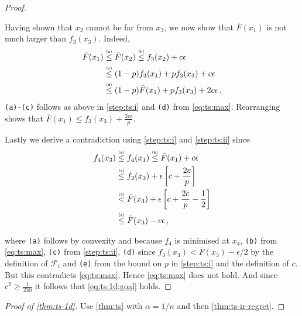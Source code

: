 \documentclass[letter, 12pt]{report}
\newcommand{\explan}[1]{\stackrel{\text{\tiny \texttt{#1}}}}
\newcommand{\sF}{\mathscr F}
\newcommand{\1}{\mathbf{1}}
\theoremstyle{plain}
\theoremstyle{definition}
\theoremstyle{remark}
\begin{document}
\begin{proof}
\begin{enumsteps}
        \item \label{step:ts:ii} Having shown that $x_2$ cannot be far from $x_3$,
        we now show that $\bar{F}(x_1)$ is not much larger than $f_3(x_3)$.
        Indeed,
        \begin{align*}
            \bar F(x_1)
             & \explan{(a)}\leq \bar F(x_2)
            \explan{(b)}\leq f_3(x_2) + c\epsilon                                 \\
             & \explan{(c)}\leq (1 - p) f_3(x_1) + p f_3(x_3) + c\epsilon         \\
             & \explan{(d)}\leq (1 - p) \bar F(x_1) + p f_3(x_3) + 2c\epsilon \,,
        \end{align*}
        \texttt{(a)-(c)} follows as above in \ref{step:ts:i} and \texttt{(d)} from \cref{eq:ts:max}.
        Rearranging shows that $\bar F(x_1) \leq f_3(x_3) + \frac{2c\epsilon}{p}$.

        \item \label{step:ts:iii}
        Lastly we derive a contradiction using \ref{step:ts:i} and \ref{step:ts:ii} since
        \begin{align*}
            f_4(x_3)
             & \explan{(a)}\leq f_4(x_1)
            \explan{(b)}\leq \bar F(x_1) + c\epsilon                                            \\
             & \explan{(c)}\leq f_3(x_3) + \epsilon\left[c + \frac{2c}{p}\right]                \\
             & \explan{(d)} < \bar F(x_3) + \epsilon\left[c + \frac{2c}{p} - \frac{1}{2}\right] \\
             & \explan{(e)}\leq \bar F(x_3) - c \epsilon \,,
        \end{align*}
    \end{enumsteps}
    where \texttt{(a)} follows by convexity and because $f_4$ is minimised at $x_4$,
    \texttt{(b)} from \cref{eq:ts:max},
    \texttt{(c)} from \ref{step:ts:ii},
    \texttt{(d)} since $f_3(x_3) < \bar F(x_3) - \epsilon/2$ by the definition of $\sF_i$
    and \texttt{(e)} from the bound on $p$ in \ref{step:ts:i} and the definition of $c$.
    But this contradicts \cref{eq:ts:max}.
    Hence \cref{eq:ts:max} does not hold. And since $c^2 \geq \frac{1}{230}$ it follows that \cref{eq:ts:1d:goal} holds.
\end{proof}
\begin{proof}[Proof of \cref{thm:ts-1d}]
    Use \cref{thm:ts} with $\alpha= 1/n$ and then \cref{thm:ts-ir-regret}.
\end{proof}
\end{document}
